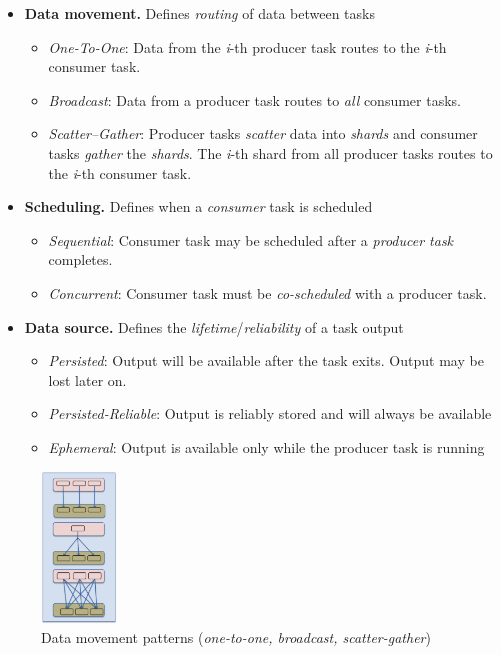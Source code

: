 \documentclass[twocolumn]{article}
\begin{document}
\begin{itemize}
\item
  \textbf{Data movement.} Defines \emph{routing} of data between tasks
  \begin{itemize}
  \item
    \emph{One-To-One}: Data from the \emph{i}-th producer task routes to
    the \emph{i}-th consumer task.
  \item
    \emph{Broadcast}: Data from a producer task routes to \emph{all}
    consumer tasks.
  \item
    \emph{Scatter--Gather}: Producer tasks \emph{scatter} data into
    \emph{shards} and consumer tasks \emph{gather} the \emph{shards}.
    The \emph{i}-th shard from all producer tasks routes to the
    \emph{i}-th consumer task.
  \end{itemize}
\item
  \textbf{Scheduling.} Defines when a \emph{consumer} task is
  scheduled
  \begin{itemize}
  \item
    \emph{Sequential}: Consumer task may be scheduled after a
    \emph{producer task} completes.
  \item
    \emph{Concurrent}: Consumer task must be \emph{co-scheduled} with a
    producer task.
  \end{itemize}
\item
  \textbf{Data source.} Defines the \emph{lifetime}/\emph{reliability}
  of a task output
  \begin{itemize}
  \item
    \emph{Persisted}: Output will be available after the task exits.
    Output may be lost later on.
  \item
    \emph{Persisted-Reliable}: Output is reliably stored and will always
    be available
  \item
    \emph{Ephemeral}: Output is available only while the producer task
    is running
  \end{itemize}
\end{itemize}

\begin{figure}[htb]
        \centering
        \includegraphics[width=0.18\textwidth]{tez31}
        \caption{Data movement patterns (\textit{one-to-one, broadcast, scatter-gather})}
        \label{fig09}
\end{figure}
\end{document}
